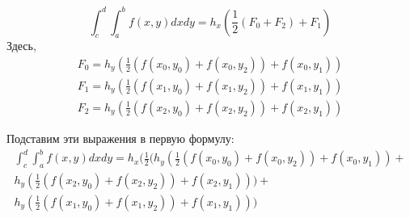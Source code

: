 \documentclass[a4paper,12pt]{article}
\begin{document}
\[\int_{c}^{d}\int_{a}^{b} f(x, y)dxdy = h_x(\frac{1}{2}(F_0 + F_2) + F_1)\]
Здесь,
\begin{align*}
    F_0 = h_y(\frac{1}{2}(f(x_0, y_0) + f(x_0, y_2)) + f(x_0, y_1))\\
    F_1 = h_y(\frac{1}{2}(f(x_1, y_0) + f(x_1, y_2)) + f(x_1, y_1))\\
    F_2 = h_y(\frac{1}{2}(f(x_2, y_0) + f(x_2, y_2)) + f(x_2, y_1))
\end{align*}

Подставим эти выражения в первую формулу:
\begin{multline*}
    \int_{c}^{d}\int_{a}^{b} f(x, y)dxdy = h_x(\frac{1}{2}(h_y(\frac{1}{2}(f(x_0, y_0) + f(x_0, y_2)) + f(x_0, y_1)) + \\h_y(\frac{1}{2}(f(x_2, y_0) + f(x_2, y_2)) + f(x_2, y_1))) + \\h_y(\frac{1}{2}(f(x_1, y_0) + f(x_1, y_2)) + f(x_1, y_1)))
\end{multline*}
\end{document}
